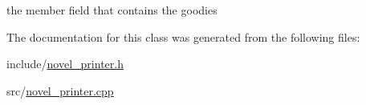 the member field that contains the goodies 



The documentation for this class was generated from the following files\-:\begin{DoxyCompactItemize}
\item 
include/\hyperlink{novel__printer_8h}{novel\-\_\-printer.\-h}\item 
src/\hyperlink{novel__printer_8cpp}{novel\-\_\-printer.\-cpp}\end{DoxyCompactItemize}
